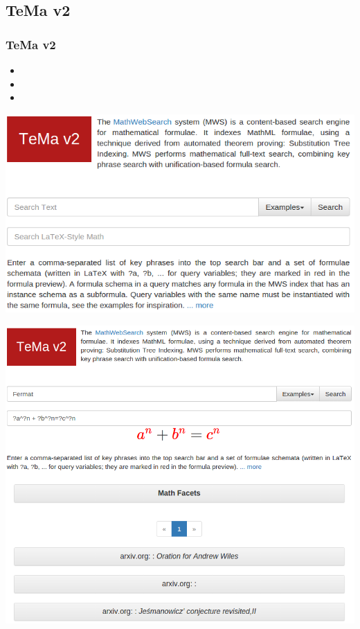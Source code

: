 \documentclass{beamer}
\begin{document}
\subsection{TeMa v2}
\begin{frame}
\frametitle{TeMa v2}
\begin{itemize}
    \item{}
    \item{}
    \item{}
\end{itemize}
\end{frame}
\begin{frame}
    \includegraphics[width=\textwidth]{img/frontend_temaV2}
\end{frame}
\begin{center}
    \includegraphics[height=0.9\textheight]{img/temaV2_results}
\end{center}
\end{document}
